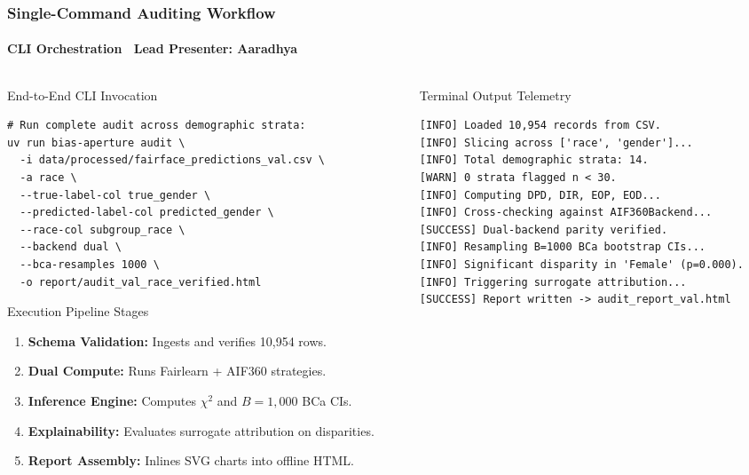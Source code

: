 \begin{frame}[fragile]
  \frametitle{Single-Command Auditing Workflow}
  \framesubtitle{CLI Orchestration \textbar\ Lead Presenter: Aaradhya}

  \begin{columns}[T]
    \begin{column}{0.54\textwidth}
      \begin{card}{End-to-End CLI Invocation}
        \fontsize{5.5pt}{6.5pt}\selectfont
\begin{verbatim}
# Run complete audit across demographic strata:
uv run bias-aperture audit \
  -i data/processed/fairface_predictions_val.csv \
  -a race \
  --true-label-col true_gender \
  --predicted-label-col predicted_gender \
  --race-col subgroup_race \
  --backend dual \
  --bca-resamples 1000 \
  -o report/audit_val_race_verified.html
\end{verbatim}
      \end{card}

      \vspace{0.1cm}
      \begin{statcard}{Execution Pipeline Stages}
        \scriptsize
        \begin{enumerate}\scriptsize
          \item \textbf{Schema Validation:} Ingests and verifies 10,954 rows.
          \item \textbf{Dual Compute:} Runs Fairlearn + AIF360 strategies.
          \item \textbf{Inference Engine:} Computes $\chi^2$ and $B=1,000$ BCa CIs.
          \item \textbf{Explainability:} Evaluates surrogate attribution on disparities.
          \item \textbf{Report Assembly:} Inlines SVG charts into offline HTML.
        \end{enumerate}
      \end{statcard}
    \end{column}

    \begin{column}{0.44\textwidth}
      \begin{card}{Terminal Output Telemetry}
        \fontsize{5.5pt}{6.5pt}\selectfont
\begin{verbatim}
[INFO] Loaded 10,954 records from CSV.
[INFO] Slicing across ['race', 'gender']...
[INFO] Total demographic strata: 14.
[WARN] 0 strata flagged n < 30.
[INFO] Computing DPD, DIR, EOP, EOD...
[INFO] Cross-checking against AIF360Backend...
[SUCCESS] Dual-backend parity verified.
[INFO] Resampling B=1000 BCa bootstrap CIs...
[INFO] Significant disparity in 'Female' (p=0.000).
[INFO] Triggering surrogate attribution...
[SUCCESS] Report written -> audit_report_val.html
\end{verbatim}
      \end{card}


\end{column}
\end{columns}
\end{frame}
